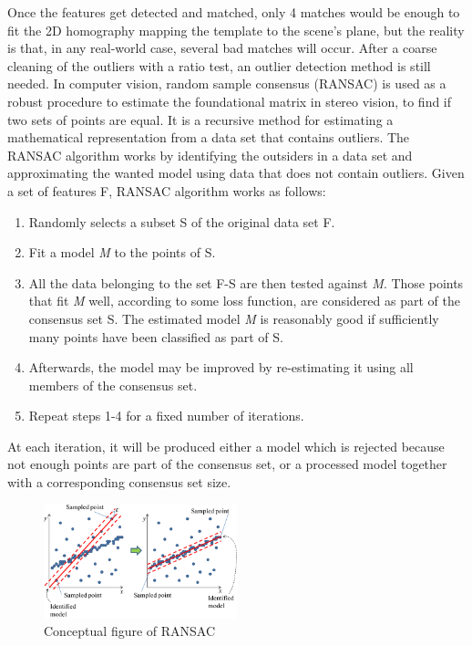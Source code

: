 \documentclass{article}
\begin{document}
Once the features get detected and matched, only 4 matches would be enough to fit the 2D homography mapping the template to the scene's plane, but the reality is that, in any real-world case, several bad matches will occur. After a coarse cleaning of the outliers with a ratio test, an outlier detection method is still needed. In computer vision, random sample consensus (RANSAC) is used as a robust procedure to estimate the foundational matrix in stereo vision, to find if two sets of points are equal. It is a recursive method for estimating a mathematical representation from a data set that contains outliers. The RANSAC algorithm works by identifying the outsiders in a data set and approximating the wanted model using data that does not contain outliers.
Given a set of features F, RANSAC algorithm works as follows:
\begin{enumerate}
  \item Randomly selects a subset S of the original data set F.
  \item Fit a model \textit{M} to the points of S.
  \item All the data belonging to the set F-S are then tested against \textit{M}. Those points that fit \textit{M} well, according to some loss function, are considered as part of the consensus set S. The estimated model \textit{M} is reasonably good if sufficiently many points have been classified as part of S.
  \item Afterwards, the model may be improved by re-estimating it using all members of the consensus set.
  \item Repeat steps 1-4 for a fixed number of iterations.
\end{enumerate}
At each iteration, it will be produced either a model which is rejected because not enough points are part of the consensus set, or a processed model together with a corresponding consensus set size.

\begin{figure}[H]
    \centering
     \includegraphics[width=0.5\textwidth]{image/Ransac.png}
    \caption{Conceptual figure of RANSAC}
\end{figure}
\end{document}
